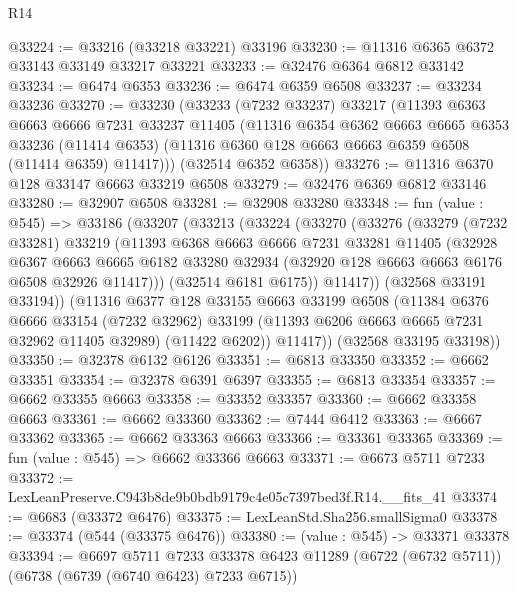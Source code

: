\begin{lexlean}{R14}
\begin{coremodule}
@33224 := @33216 (@33218 @33221) @33196
@33230 := @11316 @6365 @6372 @33143 @33149 @33217 @33221
@33233 := @32476 @6364 @6812 @33142
@33234 := @6474 @6353
@33236 := @6474 @6359 @6508
@33237 := @33234 @33236
@33270 := @33230
    (@33233
      (@7232 @33237)
      @33217
      (@11393
        @6363
        @6663
        @6666
        @7231
        @33237
        @11405
        (@11316
          @6354
          @6362
          @6663
          @6665
          @6353
          @33236
          (@11414 @6353)
          (@11316 @6360 @128 @6663 @6663 @6359 @6508 (@11414 @6359) @11417)))
      (@32514 @6352 @6358))
@33276 := @11316 @6370 @128 @33147 @6663 @33219 @6508
@33279 := @32476 @6369 @6812 @33146
@33280 := @32907 @6508
@33281 := @32908 @33280
@33348 := fun (value : @545) =>
  @33186
    (@33207
      (@33213
        (@33224
          (@33270
            (@33276
              (@33279
                (@7232 @33281)
                @33219
                (@11393
                  @6368
                  @6663
                  @6666
                  @7231
                  @33281
                  @11405
                  (@32928
                    @6367
                    @6663
                    @6665
                    @6182
                    @33280
                    @32934
                    (@32920 @128 @6663 @6663 @6176 @6508 @32926 @11417)))
                (@32514 @6181 @6175))
              @11417))
          (@32568 @33191 @33194))
        (@11316
          @6377
          @128
          @33155
          @6663
          @33199
          @6508
          (@11384
            @6376
            @6666
            @33154
            (@7232 @32962)
            @33199
            (@11393 @6206 @6663 @6665 @7231 @32962 @11405 @32989)
            (@11422 @6202))
          @11417))
      (@32568 @33195 @33198))
@33350 := @32378 @6132 @6126
@33351 := @6813 @33350
@33352 := @6662 @33351
@33354 := @32378 @6391 @6397
@33355 := @6813 @33354
@33357 := @6662 @33355 @6663
@33358 := @33352 @33357
@33360 := @6662 @33358 @6663
@33361 := @6662 @33360
@33362 := @7444 @6412
@33363 := @6667 @33362
@33365 := @6662 @33363 @6663
@33366 := @33361 @33365
@33369 := fun (value : @545) => @6662 @33366 @6663
@33371 := @6673 @5711 @7233
@33372 := LexLeanPreserve.C943b8de9b0bdb9179c4e05c7397bed3f.R14.__fits_41
@33374 := @6683 (@33372 @6476)
@33375 := LexLeanStd.Sha256.smallSigma0
@33378 := @33374 (@544 (@33375 @6476))
@33380 := (value : @545) -> @33371 @33378
@33394 := @6697
    @5711
    @7233
    @33378
    @6423
    @11289
    (@6722 (@6732 @5711))
    (@6738 (@6739 (@6740 @6423) @7233 @6715))

\end{coremodule}
\end{lexlean}
